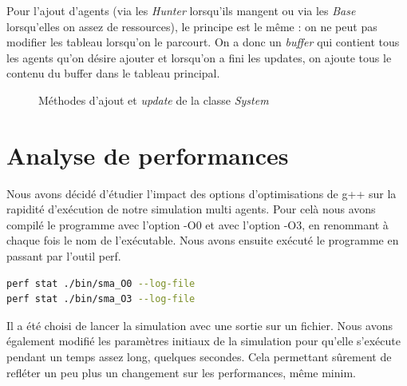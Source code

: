 \documentclass[a4paper, 12pt]{article}
\begin{document}
Pour l'ajout d'agents (via les \emph{Hunter} lorsqu'ils mangent ou via les \emph{Base} lorsqu'elles on assez de ressources), le principe
est le même : on ne peut pas modifier les tableau lorsqu'on le parcourt. On a donc un \emph{buffer} qui contient tous les agents qu'on
désire ajouter et lorsqu'on a fini les updates, on ajoute tous le contenu du buffer dans le tableau principal.

\newpage
\begin{figure}[!h]
  \centering
  \caption{Méthodes d'ajout et \emph{update} de la classe \emph{System}}
  
\end{figure}

\newpage
\section{Analyse de performances}
Nous avons décidé d'étudier l'impact des options d'optimisations de g++ sur la rapidité d'exécution de notre simulation multi agents.
Pour celà nous avons compilé le programme avec l'option -O0 et avec l'option -O3, en renommant à chaque fois le nom de l'exécutable. Nous avons ensuite exécuté le programme en passant par l'outil perf.
\begin{mdframed}[backgroundcolor=light-gray, roundcorner=20pt,
  innerleftmargin=20, innertopmargin=1, innerbottommargin=1, 
  outerlinewidth=1, linecolor=darkgray]
  \begin{lstlisting}[language=Bash]
perf stat ./bin/sma_O0 --log-file
perf stat ./bin/sma_O3 --log-file\end{lstlisting}
\end{mdframed}
Il a été choisi de lancer la simulation avec une sortie sur un fichier.
Nous avons également modifié les paramètres initiaux de la simulation pour qu'elle s'exécute pendant un temps assez long, quelques secondes. Cela permettant sûrement de refléter un peu plus un changement sur les performances, même minim.
\end{document}
